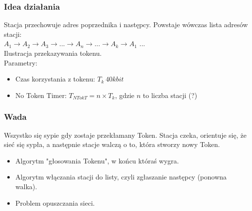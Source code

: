\documentclass[a4paper,twoside]{article}
\begin{document}
		\subsubsection{Idea działania}
			Stacja przechowuje adres poprzednika i następcy. Powstaje wówczas lista adresów stacji:\\
			$ A_1 \rightarrow A_2 \rightarrow A_3 \rightarrow ... \rightarrow A_n \rightarrow ... \rightarrow A_k \rightarrow A_1 $ ...\\
			Ilustracja przekazywania tokenu.\\
			Parametry:
			\begin{itemize}
				\item Czas korzystania z tokenu: $ T_k~40kbit $
				\item No Token Timer: $ T_{NTokT}=n\times T_k $, gdzie $ n $ to liczba stacji (?)
			\end{itemize}
		\subsubsection{Wada}
			Wszystko się sypie gdy zostaje przekłamany Token. Stacja czeka, orientuje się, że sieć się sypła, a następnie stacje walczą o to, która stworzy nowy Token.
			\begin{itemize}
				\item Algorytm "głosowania Tokenu", w końcu któraś wygra.
				\item Algorytm włączania stacji do listy, czyli zgłaszanie następcy (ponowna walka).
				\item Problem opuszczania sieci.
			\end{itemize}
\end{document}

